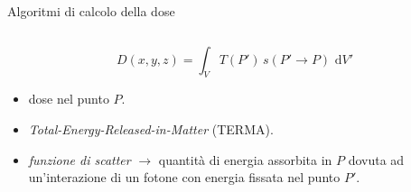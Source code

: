\documentclass{beamer}
\newcommand{\de}{\,\textrm{d}}
\begin{document}
\begin{frame}{Algoritmi di calcolo della dose}
\begin{columns}
\end{columns}
\vspace{.5cm}
\small $$D(x,y,z) = \int_V T(P')\,s(P'\rightarrow P)\, \de V'$$
\begin{itemize}
\scriptsize
\item {} dose nel punto $P$.
\item {} \textit{Total-Energy-Released-in-Matter} (TERMA). %
\item {} \textit{funzione di scatter} $\rightarrow$ quantità di energia assorbita in $P$ dovuta ad un'interazione di un fotone con energia fissata nel punto $P'$.
\end{itemize}
\end{frame}
\end{document}
